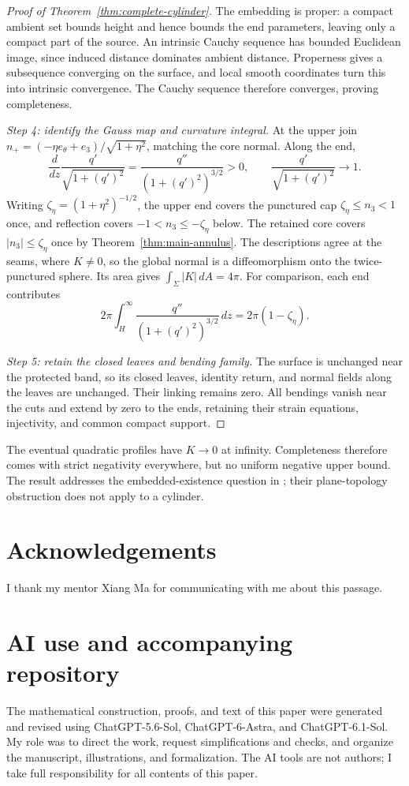\documentclass[11pt]{amsart}
\theoremstyle{definition}
\theoremstyle{remark}
\numberwithin{equation}{section}
\begin{document}
\begin{proof}[Proof of Theorem~\ref{thm:complete-cylinder}]
The embedding is proper: a compact ambient set bounds height and hence
bounds the end parameters, leaving only a compact part of the source.
An intrinsic Cauchy sequence has bounded Euclidean image, since induced
distance dominates ambient distance. Properness gives a subsequence
converging on the surface, and local smooth coordinates turn this into
intrinsic convergence. The Cauchy sequence therefore converges, proving
completeness.

\emph{Step 4: identify the Gauss map and curvature integral.}
At the upper join $n_+=(-\eta e_\theta+e_3)/\sqrt{1+\eta^2}$,
matching the core normal. Along the end,
\[
 \frac d{dz}\frac{q'}{\sqrt{1+(q')^2}}
 =\frac{q''}{(1+(q')^2)^{3/2}}>0,
 \qquad\frac{q'}{\sqrt{1+(q')^2}}\longrightarrow1.
\]
Writing $\zeta_\eta=(1+\eta^2)^{-1/2}$, the upper end covers the
punctured cap $\zeta_\eta\le n_3<1$ once, and reflection covers
$-1<n_3\le-\zeta_\eta$ below. The retained core covers
$|n_3|\le\zeta_\eta$ once by
Theorem~\ref{thm:main-annulus}. The descriptions agree at the seams,
where $K\ne0$, so the global normal is a diffeomorphism onto the
twice-punctured sphere. Its area gives $\int_\Sigma|K|\,dA=4\pi$.
For comparison, each end contributes
\[
 2\pi\int_H^\infty\frac{q''}{(1+(q')^2)^{3/2}}\,dz
 =2\pi(1-\zeta_\eta).
\]

\emph{Step 5: retain the closed leaves and bending family.}
The surface is unchanged near the protected band, so its closed leaves,
identity return, and normal fields along the leaves are unchanged.
Their linking remains zero. All bendings vanish near the cuts and extend
by zero to the ends, retaining their strain equations, injectivity, and
common compact support.
\end{proof}
The eventual quadratic profiles have $K\to0$ at infinity. Completeness
therefore comes with strict negativity everywhere, but no uniform negative
upper bound. The result addresses the embedded-existence question in
\cite[after Theorem~3.4]{NiZhangZhang}; their plane-topology obstruction
does not apply to a cylinder.


\section*{Acknowledgements}
I thank my mentor Xiang Ma for communicating with me about this passage.

\section*{AI use and accompanying repository}
The mathematical construction, proofs, and text of this paper were generated
and revised using ChatGPT-5.6-Sol, ChatGPT-6-Astra, and ChatGPT-6.1-Sol.
My role was to direct the work, request simplifications and checks, and
organize the manuscript, illustrations, and formalization. The AI tools
are not authors; I take full responsibility for all contents of this paper.
\end{document}
